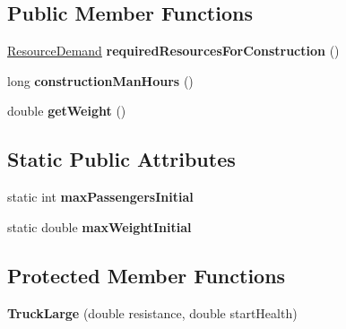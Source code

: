 \subsection*{Public Member Functions}
\begin{DoxyCompactItemize}
\item 
\hyperlink{classuniverse_1_1_resource_demand}{Resource\+Demand} {\bfseries required\+Resources\+For\+Construction} ()\hypertarget{classtools_1_1vehicles_1_1roadgoing_1_1_truck_large_aa6c2272a8fb014537ee9a00977f2e94a}{}\label{classtools_1_1vehicles_1_1roadgoing_1_1_truck_large_aa6c2272a8fb014537ee9a00977f2e94a}

\item 
long {\bfseries construction\+Man\+Hours} ()\hypertarget{classtools_1_1vehicles_1_1roadgoing_1_1_truck_large_a6ba6d491081b0a632874d5aef2ad8153}{}\label{classtools_1_1vehicles_1_1roadgoing_1_1_truck_large_a6ba6d491081b0a632874d5aef2ad8153}

\item 
double {\bfseries get\+Weight} ()\hypertarget{classtools_1_1vehicles_1_1roadgoing_1_1_truck_large_a476cdc1b88758e6428fd6b4924782a58}{}\label{classtools_1_1vehicles_1_1roadgoing_1_1_truck_large_a476cdc1b88758e6428fd6b4924782a58}

\end{DoxyCompactItemize}
\subsection*{Static Public Attributes}
\begin{DoxyCompactItemize}
\item 
static int {\bfseries max\+Passengers\+Initial}\hypertarget{classtools_1_1vehicles_1_1roadgoing_1_1_truck_large_a5309abce9047c1fe2f1b89d7dc9335a0}{}\label{classtools_1_1vehicles_1_1roadgoing_1_1_truck_large_a5309abce9047c1fe2f1b89d7dc9335a0}

\item 
static double {\bfseries max\+Weight\+Initial}\hypertarget{classtools_1_1vehicles_1_1roadgoing_1_1_truck_large_a0e45a84473e280ce5610d85f97d1370f}{}\label{classtools_1_1vehicles_1_1roadgoing_1_1_truck_large_a0e45a84473e280ce5610d85f97d1370f}

\end{DoxyCompactItemize}
\subsection*{Protected Member Functions}
\begin{DoxyCompactItemize}
\item 
{\bfseries Truck\+Large} (double resistance, double start\+Health)\hypertarget{classtools_1_1vehicles_1_1roadgoing_1_1_truck_large_a4ee9ca1aa553dd654f07af7cc9d16f89}{}\label{classtools_1_1vehicles_1_1roadgoing_1_1_truck_large_a4ee9ca1aa553dd654f07af7cc9d16f89}

\end{DoxyCompactItemize}
